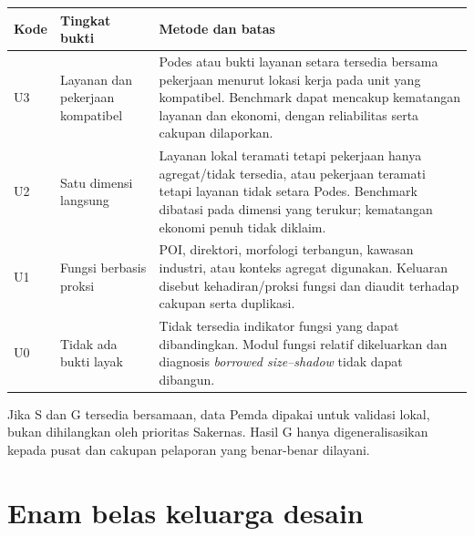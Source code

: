 \documentclass[10pt]{article}
\begin{document}
\begin{tabularx}{\textwidth}{@{}P{0.08\textwidth}P{0.24\textwidth}Y@{}}
\toprule
Kode & Tingkat bukti & Metode dan batas \\
\midrule
U3 & Layanan dan pekerjaan kompatibel & Podes atau bukti layanan setara tersedia bersama pekerjaan menurut lokasi kerja pada unit yang kompatibel. Benchmark dapat mencakup kematangan layanan dan ekonomi, dengan reliabilitas serta cakupan dilaporkan. \\
U2 & Satu dimensi langsung & Layanan lokal teramati tetapi pekerjaan hanya agregat/tidak tersedia, atau pekerjaan teramati tetapi layanan tidak setara Podes. Benchmark dibatasi pada dimensi yang terukur; kematangan ekonomi penuh tidak diklaim. \\
U1 & Fungsi berbasis proksi & POI, direktori, morfologi terbangun, kawasan industri, atau konteks agregat digunakan. Keluaran disebut kehadiran/proksi fungsi dan diaudit terhadap cakupan serta duplikasi. \\
U0 & Tidak ada bukti layak & Tidak tersedia indikator fungsi yang dapat dibandingkan. Modul fungsi relatif dikeluarkan dan diagnosis \textit{borrowed size--shadow} tidak dapat dibangun. \\
\bottomrule
\end{tabularx}

Jika S dan G tersedia bersamaan, data Pemda dipakai untuk validasi lokal, bukan dihilangkan oleh prioritas Sakernas. Hasil G hanya digeneralisasikan kepada pusat dan cakupan pelaporan yang benar-benar dilayani.

\section{Enam belas keluarga desain}
\end{document}
